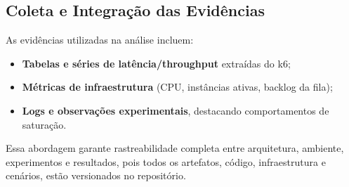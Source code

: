 \subsection{Coleta e Integração das Evidências}

As evidências utilizadas na análise incluem:

\begin{itemize}
    \item \textbf{Tabelas e séries de latência/throughput} extraídas do k6;
    \item \textbf{Métricas de infraestrutura} (CPU, instâncias ativas, backlog da fila);
    \item \textbf{Logs e observações experimentais}, destacando comportamentos de saturação.
\end{itemize}

Essa abordagem garante rastreabilidade completa entre arquitetura, ambiente, experimentos
e resultados, pois todos os artefatos, código, infraestrutura e cenários, estão versionados no repositório.


